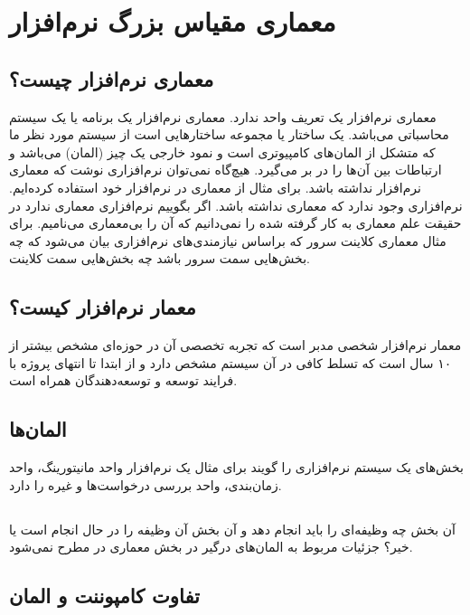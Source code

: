 \section{معماری مقیاس بزرگ نرم‌افزار}

\subsection{معماری نرم‌افزار چیست؟}

معماری نرم‌افزار یک تعریف واحد ندارد. معماری نرم‌افزار یک برنامه یا یک سیستم
محاسباتی می‌باشد. یک ساختار یا مجموعه ساختار‌هایی است از سیستم مورد نظر ما که
متشکل از المان‌های کامپیوتری است و نمود خارجی یک چیز (المان) می‌باشد و ارتباطات
بین آن‌ها را در بر می‌گیرد. هیچ‌گاه نمی‌توان نرم‌افزاری نوشت که معماری نرم‌افزار
نداشته باشد. برای مثال از معماری  در نرم‌افزار خود استفاده کرده‌ایم.
نرم‌افزاری وجود ندارد که معماری نداشته باشد. اگر بگوییم نرم‌افزاری معماری ندارد
در حقیقت علم معماری به کار گرفته شده را نمی‌دانیم که آن را بی‌معماری می‌نامیم.
برای مثال معماری کلاینت سرور که براساس نیازمندی‌های نرم‌افزاری بیان می‌شود که چه
بخش‌هایی سمت سرور باشد چه‌ بخش‌هایی سمت کلاینت.

\subsection{معمار نرم‌افزار کیست؟}

معمار نرم‌افزار شخصی مدبر است که تجربه تخصصی آن در حوزه‌ای مشخص بیشتر از ۱۰ سال
است که تسلط کافی در آن سیستم مشخص دارد و از ابتدا تا انتهای پروژه با فرایند
توسعه و توسعه‌دهندگان همراه است.

\subsection{المان‌ها}

بخش‌های یک سیستم نرم‌افزاری را گویند برای مثال یک نرم‌افزار واحد مانیتورینگ،
واحد زمان‌بندی، واحد بررسی درخواست‌ها و غیره را دارد.

\subsection{}

آن بخش چه وظیفه‌ای را باید انجام دهد و آن بخش آن وظیفه را در حال انجام است یا
خیر؟ جزئیات مربوط به المان‌های درگیر در بخش معماری در  مطرح نمی‌شود.

\subsection{تفاوت کامپوننت و المان}


